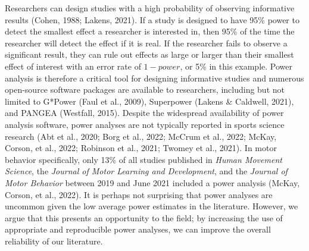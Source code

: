 \documentclass[
  man, donotrepeattitle,mask,floatsintext]{apa7}
\begin{document}
Researchers can design studies with a high probability of observing informative results (Cohen, 1988; Lakens, 2021). If a study is designed to have 95\% power to detect the smallest effect a researcher is interested in, then 95\% of the time the researcher will detect the effect if it is real. If the researcher fails to observe a significant result, they can rule out effects as large or larger than their smallest effect of interest with an error rate of \(1 - power\), or 5\% in this example. Power analysis is therefore a critical tool for designing informative studies and numerous open-source software packages are available to researchers, including but not limited to G*Power (Faul et al., 2009), Superpower (Lakens \& Caldwell, 2021), and PANGEA (Westfall, 2015). Despite the widespread availability of power analysis software, power analyses are not typically reported in sports science research (Abt et al., 2020; Borg et al., 2022; McCrum et al., 2022; McKay, Corson, et al., 2022; Robinson et al., 2021; Twomey et al., 2021). In motor behavior specifically, only 13\% of all studies published in \emph{Human Movement Science}, the \emph{Journal of Motor Learning and Development}, and the \emph{Journal of Motor Behavior} between 2019 and June 2021 included a power analysis (McKay, Corson, et al., 2022). It is perhaps not surprising that power analyses are uncommon given the low average power estimates in the literature. However, we argue that this presents an opportunity to the field; by increasing the use of appropriate and reproducible power analyses, we can improve the overall reliability of our literature.
\end{document}
